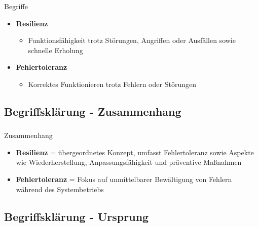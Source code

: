 \begin{frame}
    \frametitle{\insertsection}
    \framesubtitle{\insertsubsection}

    \begin{block}{Begriffe}
        \begin{itemize}
            \item \textbf{Resilienz}
                \begin{itemize}
                     \item Funktionsfähigkeit trotz Störungen, Angriffen oder Ausfällen sowie schnelle Erholung\\
                \end{itemize}
            \item \textbf{Fehlertoleranz}
                \begin{itemize}
                    \item Korrektes Funktionieren trotz Fehlern oder Störungen
                \end{itemize}
        \end{itemize}
    \end{block}
\end{frame}


\subsection{Begriffsklärung - Zusammenhang}

\begin{frame}
    \frametitle{\insertsection}
    \framesubtitle{\insertsubsection}

    \begin{block}{Zusammenhang}
        \begin{itemize}
            \item \textbf{Resilienz} = übergeordnetes Konzept, umfasst Fehlertoleranz sowie Aspekte wie Wiederherstellung, Anpassungsfähigkeit und präventive Maßnahmen\\
            \item \textbf{Fehlertoleranz} = Fokus auf unmittelbarer Bewältigung von Fehlern während des Systembetriebs
        \end{itemize}
    \end{block}
\end{frame}

\subsection{Begriffsklärung - Ursprung}

